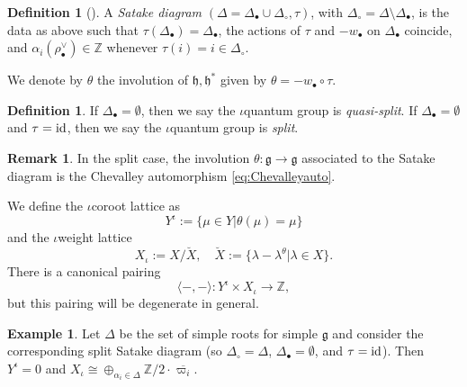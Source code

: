 \documentclass[10pt]{amsart}
\numberwithin{equation}{section}
\theoremstyle{definition}
\newtheorem{remark}[theorem]{Remark}
\newtheorem{definition}[theorem]{Definition}
\newtheorem{example}[theorem]{Example}
\newcommand{\id}{{\rm id}}
\begin{document}
\begin{definition}[\cite{W22}]\label{Satake_diagram}
    A \emph{Satake diagram} $(\Delta=\Delta_{\bullet}\cup \Delta_{\circ}, \tau)$, with $\Delta_{\circ}=\Delta\setminus \Delta_{\bullet}$, is the data as above such that $\tau(\Delta_{\bullet})=\Delta_{\bullet}$, the actions of $\tau$ and $-w_{\bullet}$ on $\Delta_{\bullet}$ coincide, and $\alpha_i (\rho_{\bullet}^{\vee}) \in \mathbb{Z}$ whenever $\tau(i)=i\in\Delta_{\circ}$.
\end{definition}
We denote by $\theta$ the involution of $\mathfrak{h},\mathfrak{h}^*$ given by $\theta=-w_{\bullet}\circ \tau$.

\begin{definition}
    If $\Delta_{\bullet}= \emptyset$, then we say the $\iota$quantum group is \emph{quasi-split}. If $\Delta_{\bullet}=\emptyset$ and $\tau=\id$, then we say the $\iota$quantum group is \emph{split}.
\end{definition}

\begin{remark}
    In the split case, the involution $\theta:\mathfrak{g}\rightarrow \mathfrak{g}$ associated to the Satake diagram is the Chevalley automorphism \eqref{eq:Chevalleyauto}.  
\end{remark}

We define the $\iota$coroot lattice as
\begin{equation*}
    Y^{\iota}:=\{\mu\in Y|\theta(\mu)=\mu\}
\end{equation*}
and the $\iota$weight lattice
\[
X_{\iota}:=X/\breve{X}, \quad \breve{X}:=\{\lambda-\lambda^{\theta}|\lambda\in X\}.
\]
There is a canonical pairing
\[
\langle-,-\rangle: Y^{\iota} \times X_{\iota} \rightarrow \mathbb{Z},
\]
but this pairing will be degenerate in general.

\begin{example}
    Let $\Delta$ be the set of simple roots for simple $\mathfrak{g}$ and consider the corresponding split Satake diagram (so $\Delta_{\circ} = \Delta$, $\Delta_{\bullet}= \emptyset$, and $\tau= \id$). Then $Y^{\iota} = 0$ and $X_{\iota}\cong \oplus_{\alpha_i\in \Delta}\mathbb{Z}/2\cdot \overline{\varpi_i}$.
\end{example}
\end{document}
